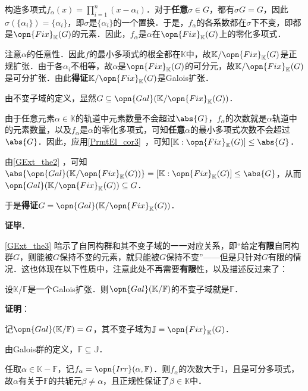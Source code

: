 构造多项式$f_\alpha(x)=\prod_{i=1}^n(x-\alpha_i)$．对于\textbf{任意}$\sigma\in G$，都有$\sigma G=G$，因此$\sigma(\{\alpha_i\})=\{\alpha_i\}$，即$\sigma$是$\{\alpha_i\}$的一个置换．于是，$f_\alpha$的各系数都在$\sigma$下不变，即都是$\opn{Fix}_\mathbb{K}(G)$的元素．因此，$f_\alpha$是$\alpha$在$\opn{Fix}_\mathbb{K}(G)$上的零化多项式．

注意$\alpha$的任意性．因此$f$的最小多项式的根全都在$\mathbb{K}$中，故$\mathbb{K}/\opn{Fix}_\mathbb{K}(G)$是正规扩张．由于各$\alpha_i$不相等，故$\alpha$是$\opn{Fix}_\mathbb{K}(G)$的可分元，故$\mathbb{K}/\opn{Fix}_\mathbb{K}(G)$是可分扩张．由此\textbf{得证}$\mathbb{K}/\opn{Fix}_\mathbb{K}(G)$是Galois扩张．

由不变子域的定义，显然$G\subseteq\opn{Gal}(\mathbb{K}/\opn{Fix}_\mathbb{K}(G))$．

由于任意元素$\alpha\in\mathbb{K}$的轨道中元素数量不会超过$\abs{G}$，$f_\alpha$的次数就是$\alpha$轨道中的元素数量，以及$f_\alpha$是$\alpha$的零化多项式，可知\textbf{任意}$\alpha$的最小多项式次数不会超过$\abs{G}$．因此，应用\autoref{PrmtEl_cor3}~，可知$[\mathbb{K}:\opn{Fix}_\mathbb{K}(G)]\leq \abs{G}$．

由\autoref{GExt_the2} ，可知$\abs{\opn{Gal}(\mathbb{K}/\opn{Fix}_\mathbb{K}(G))}=[\mathbb{K}:\opn{Fix}_\mathbb{K}(G)]\leq\abs{G}$，从而$\opn{Gal}(\mathbb{K}/\opn{Fix}_\mathbb{K}(G))\subseteq G$．

于是\textbf{得证}$G = \opn{Gal}(\mathbb{K}/\opn{Fix}_\mathbb{K}(G))$．

\textbf{证毕}．


\autoref{GExt_the3} 暗示了自同构群和其不变子域的一一对应关系，即“给定\textbf{有限}自同构群$G$，则能被$G$保持不变的元素，就只能被$G$保持不变”——但是只针对$G$有限的情况．这也体现在以下性质中，注意此处不再需要\textbf{有限}性，以及描述反过来了：



\begin{theorem}{}\label{GExt_the4}
设$\mathbb{K}/\mathbb{F}$是一个Galois扩张．则$\opn{Gal}(\mathbb{K}/\mathbb{F})$的不变子域就是$\mathbb{F}$．
\end{theorem}

\textbf{证明}：

记$\opn{Gal}(\mathbb{K}/\mathbb{F})=G$，其不变子域为$\mathbb{J}=\opn{Fix}_\mathbb{K}(G)$．

由Galois群的定义，$\mathbb{F}\subseteq\mathbb{J}$．

任取$\alpha\in\mathbb{K}-\mathbb{F}$，记$f_\alpha=\opn{Irr}(\alpha, \mathbb{F})$．则$f_\alpha$的次数大于1，且是可分多项式，故$\alpha$有关于$\mathbb{F}$的共轭元$\beta\neq \alpha$，且正规性保证了$\beta\in\mathbb{K}$中．

